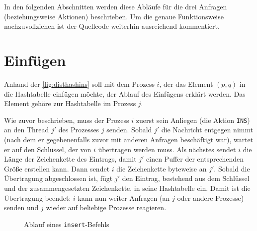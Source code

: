 \documentclass{scrreprt}
\begin{document}
In den folgenden Abschnitten werden diese Abläufe für die drei Anfragen (beziehungsweise Aktionen) beschrieben. Um die genaue Funktionsweise nachzuvollziehen ist der Quellcode weiterhin ausreichend kommentiert.

\section{Einfügen}

Anhand der \autoref{fig:disthashins} soll mit dem Prozess $i$, der das Element $(p,q)$ in die Hashtabelle einfügen möchte, der Ablauf des Einfügens erklärt werden. Das Element gehöre zur Hashtabelle im Prozess $j$.

Wie zuvor beschrieben, muss der Prozess $i$ zuerst sein Anliegen (die Aktion \lstinline`INS`) an den Thread $j'$ des Prozesses $j$ senden. Sobald $j'$ die Nachricht entgegen nimmt (nach dem er gegebenenfalls zuvor mit anderen Anfragen beschäftigt war), wartet er auf den Schlüssel, der von $i$ übertragen werden muss. Als nächstes sendet $i$ die Länge der Zeichenkette des Eintrags, damit $j'$ einen Puffer der entsprechenden Größe erstellen kann. Dann sendet $i$ die Zeichenkette byteweise an $j'$. Sobald die Übertragung abgeschlossen ist, fügt $j'$ den Eintrag, bestehend aus dem Schlüssel und der zusammengesetzten Zeichenkette, in seine Hashtabelle ein. Damit ist die Übertragung beendet: $i$ kann nun weiter Anfragen (an $j$ oder andere Prozesse) senden und $j$ wieder auf beliebige Prozesse reagieren.
\begin{figure}[!ht]
\centering
{}
\caption{Ablauf eines \lstinline`insert`-Befehls}
\label{fig:disthashins}
\end{figure}
\end{document}
